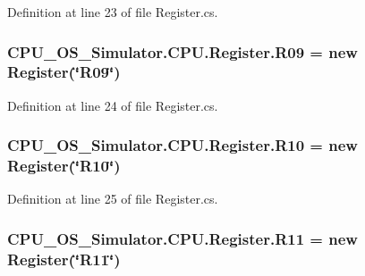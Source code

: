 Definition at line 23 of file Register.\+cs.

\hypertarget{class_c_p_u___o_s___simulator_1_1_c_p_u_1_1_register_a6d88d738c0794179adbe47a73359b769}{}
\subsubsection[{R09}]{ C\+P\+U\+\_\+\+O\+S\+\_\+\+Simulator.\+C\+P\+U.\+Register.\+R09 = new {\bf Register}(\char`\"{}R09\char`\"{})\hspace{0.3cm}{\ttfamily [static]}}\label{class_c_p_u___o_s___simulator_1_1_c_p_u_1_1_register_a6d88d738c0794179adbe47a73359b769}


Definition at line 24 of file Register.\+cs.

\hypertarget{class_c_p_u___o_s___simulator_1_1_c_p_u_1_1_register_aafde355f621c35a2994b26ac1ad8c61b}{}
\subsubsection[{R10}]{ C\+P\+U\+\_\+\+O\+S\+\_\+\+Simulator.\+C\+P\+U.\+Register.\+R10 = new {\bf Register}(\char`\"{}R10\char`\"{})\hspace{0.3cm}{\ttfamily [static]}}\label{class_c_p_u___o_s___simulator_1_1_c_p_u_1_1_register_aafde355f621c35a2994b26ac1ad8c61b}


Definition at line 25 of file Register.\+cs.

\hypertarget{class_c_p_u___o_s___simulator_1_1_c_p_u_1_1_register_a4f593c7d99a4e42966dea3749c07b79d}{}
\subsubsection[{R11}]{ C\+P\+U\+\_\+\+O\+S\+\_\+\+Simulator.\+C\+P\+U.\+Register.\+R11 = new {\bf Register}(\char`\"{}R11\char`\"{})\hspace{0.3cm}{\ttfamily [static]}}\label{class_c_p_u___o_s___simulator_1_1_c_p_u_1_1_register_a4f593c7d99a4e42966dea3749c07b79d}


